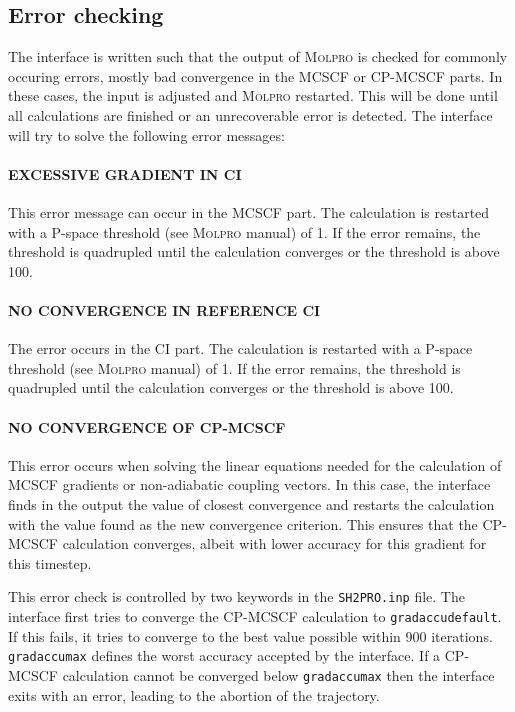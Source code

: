 \documentclass[a4paper,11pt,DIV=15,openany,twoside=false]{scrbook}
\newcommand{\ttt}[1]{\texttt{#1}}
\begin{document}
\subsection{Error checking}

The interface is written such that the output of \textsc{Molpro} is checked for commonly occuring errors, mostly bad convergence in the MCSCF or CP-MCSCF parts. In these cases, the input is adjusted and \textsc{Molpro} restarted. This will be done until all calculations are finished or an unrecoverable error is detected.
The interface will try to solve the following error messages:

\paragraph{EXCESSIVE GRADIENT IN CI} This error message can occur in the MCSCF part. The calculation is restarted with a P-space threshold (see \textsc{Molpro} manual) of 1. If the error remains, the threshold is quadrupled until the calculation converges or the threshold is above 100.

\paragraph{NO CONVERGENCE IN REFERENCE CI} The error occurs in the CI part. The calculation is restarted with a P-space threshold (see \textsc{Molpro} manual) of 1. If the error remains, the threshold is quadrupled until the calculation converges or the threshold is above 100.

\paragraph{NO CONVERGENCE OF CP-MCSCF} This error occurs when solving the linear equations needed for the calculation of MCSCF gradients or non-adiabatic coupling vectors. In this case, the interface finds in the output the value of closest convergence and restarts the calculation with the value found as the new convergence criterion. This ensures that the CP-MCSCF calculation converges, albeit with lower accuracy for this gradient for this timestep.

This error check is controlled by two keywords in the \ttt{SH2PRO.inp} file. The interface first tries to converge the CP-MCSCF calculation to \ttt{gradaccudefault}. If this fails, it tries to converge to the best value possible within 900 iterations. \ttt{gradaccumax} defines the worst accuracy accepted by the interface. If a CP-MCSCF calculation cannot be converged below \ttt{gradaccumax} then the interface exits with an error, leading to the abortion of the trajectory.
\end{document}
